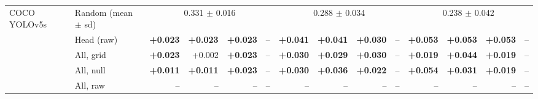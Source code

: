 \begin{tabular}{llrrrrrrrrrrrr}
\midrule
COCO YOLOv5s & Random (mean $\pm$ sd) & \multicolumn{4}{c}{0.331 $\pm$ 0.016} & \multicolumn{4}{c}{0.288 $\pm$ 0.034} & \multicolumn{4}{c}{0.238 $\pm$ 0.042} \\
 & Head (raw) & \textbf{+0.023} & \textbf{+0.023} & \textbf{+0.023} & -- & \textbf{+0.041} & \textbf{+0.041} & \textbf{+0.030} & -- & \textbf{+0.053} & \textbf{+0.053} & \textbf{+0.053} & -- \\
 & All, grid & \textbf{+0.023} & +0.002 & \textbf{+0.023} & -- & \textbf{+0.030} & \textbf{+0.029} & \textbf{+0.030} & -- & \textbf{+0.019} & \textbf{+0.044} & \textbf{+0.019} & -- \\
 & All, null & \textbf{+0.011} & \textbf{+0.011} & \textbf{+0.023} & -- & \textbf{+0.030} & \textbf{+0.036} & \textbf{+0.022} & -- & \textbf{+0.054} & \textbf{+0.031} & \textbf{+0.019} & -- \\
 & All, raw & -- & -- & -- & -- & -- & -- & -- & -- & -- & -- & -- & -- \\
\bottomrule
\end{tabular}
